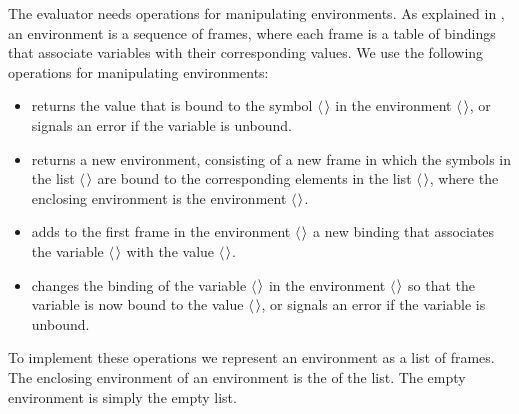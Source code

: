 The evaluator needs operations for manipulating environments.  As explained in
, an environment is a sequence of frames, where each frame is
a table of bindings that associate variables with their corresponding values.
We use the following operations for manipulating environments:

\begin{itemize}
\item
{}

returns the value that is bound to the symbol \( \langle \)\( \kern0.08em\rangle \) in the environment
\( \langle \)\( \kern0.08em\rangle \), or signals an error if the variable is unbound.

\item
{}

returns a new environment, consisting of a new frame in which the symbols in
the list \( \langle \)\( \kern0.08em\rangle \) are bound to the corresponding elements in the list
\( \langle \)\( \kern0.08em\rangle \), where the enclosing environment is the environment
\( \langle \)\( \kern0.08em\rangle \).

\item
{}

adds to the first frame in the environment \( \langle \)\( \kern0.08em\rangle \) a new binding that
associates the variable \( \langle \)\( \kern0.08em\rangle \) with the value \( \langle \)\( \kern0.08em\rangle \).

\item
{}

changes the binding of the variable \( \langle \)\( \kern0.08em\rangle \) in the environment \( \langle \)\( \kern0.08em\rangle \)
so that the variable is now bound to the value \( \langle \)\( \kern0.08em\rangle \), or signals an
error if the variable is unbound.
\end{itemize}

\noindent
To implement these operations we represent an environment as a list of frames.
The enclosing environment of an environment is the  of the list.  The
empty environment is simply the empty list.

